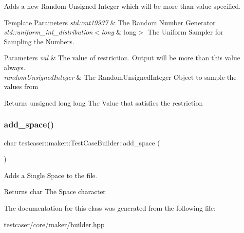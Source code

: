 Adds a new Random Unsigned Integer which will be more than value specified. 


\begin{DoxyTemplParams}{Template Parameters}
{\em std\+::mt19937} & The Random Number Generator \\
\hline
{\em std\+::uniform\+\_\+int\+\_\+distribution$<$long} & long$>$ The Uniform Sampler for Sampling the Numbers. \\
\hline
\end{DoxyTemplParams}

\begin{DoxyParams}{Parameters}
{\em val} & The value of restriction. Output will be more than this value always. \\
\hline
{\em random\+Unsigned\+Integer} & The Random\+Unsigned\+Integer Object to sample the values from \\
\hline
\end{DoxyParams}
\begin{DoxyReturn}{Returns}
unsigned long long The Value that satisfies the restriction 
\end{DoxyReturn}
\mbox{\label{classtestcaser_1_1maker_1_1TestCaseBuilder_a5c23f3b3d3533c48477741da8337af98}} 
\subsubsection{\texorpdfstring{add\_space()}{add\_space()}}
{\footnotesize\ttfamily char testcaser\+::maker\+::\+Test\+Case\+Builder\+::add\+\_\+space (\begin{DoxyParamCaption}{ }\end{DoxyParamCaption})\hspace{0.3cm}{\ttfamily [inline]}}



Adds a Single Space to the file. 

\begin{DoxyReturn}{Returns}
char The Space character 
\end{DoxyReturn}


The documentation for this class was generated from the following file\+:\begin{DoxyCompactItemize}
\item 
testcaser/core/maker/builder.\+hpp\end{DoxyCompactItemize}
